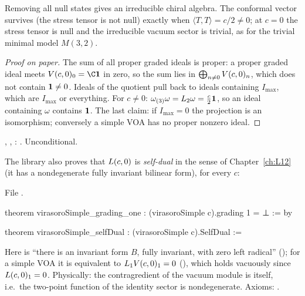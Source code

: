 \begin{physics}
Removing all null states gives an irreducible chiral algebra. The conformal vector survives (the stress
tensor is not null) exactly when $\langle T,T\rangle = c/2\ne0$; at $c = 0$ the stress tensor is null and
the irreducible vacuum sector is trivial, as for the trivial minimal model $M(3,2)$.
\end{physics}

\begin{proof}[Proof on paper]
The sum of all proper graded ideals is proper: a proper graded ideal meets $\lsixV_0 = \C\lsixvac$ in
zero, so the sum lies in $\bigoplus_{n\ne0}V(c,0)_n$, which does not contain $\mathbf{1}\ne0$. Ideals of the
quotient pull back to ideals containing $I_{\max}$, which are $I_{\max}$ or everything. For $c\ne0$:
$\omega_{(3)}\omega = L_2\omega = \frac c2\mathbf{1}$, so an ideal containing $\omega$ contains $\mathbf{1}$.
The last claim: if $I_{\max} = 0$ the projection is an isomorphism; conversely a simple VOA has no
proper nonzero ideal.
\end{proof}

\begin{status}
\allowbreak{}\allowbreak{}\allowbreak{}, \allowbreak{}\allowbreak{}\allowbreak{},
\allowbreak{}\allowbreak{}: \lean{[propext, Classical.}\allowbreak{}\allowbreak\lean{sound]}. Unconditional.
\end{status}

The library also proves that $L(c,0)$ is \emph{self-dual} in the sense of Chapter~\ref{ch:L12} (it has a
nondegenerate fully invariant bilinear form), for every $c$:

File .
\begin{leancode}
theorem virasoroSimple_grading_one : (virasoroSimple c).grading 1 = ⊥ := by

theorem virasoroSimple_selfDual : (virasoroSimple c).SelfDual :=
\end{leancode}
Here  is ``there is an invariant form $B$, fully invariant, with zero left radical''
(); for a simple VOA it is equivalent to
$L_1V(c,0)_1 = 0$ (), which holds vacuously since $L(c,0)_1 = 0$. Physically: the
contragredient of the vacuum module is itself, i.e.\ the two-point function of the identity sector is
nondegenerate. Axioms: \lean{[propext, Classical.}\allowbreak{}\allowbreak\lean{sound]}.

